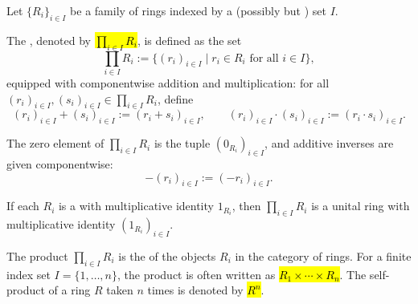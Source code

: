 \begin{definition} \label{definition:products_of_rings}
Let $\{R_i\}_{i \in I}$ be a family of rings indexed by a (possibly  but ) set $I$.

The , denoted by \hl{$\prod_{i \in I} R_i$}, is defined as the set
$$ \prod_{i \in I} R_i := \{ (r_i)_{i \in I} \mid r_i \in R_i \text{ for all } i \in I \}, $$
equipped with componentwise addition and multiplication: for all $(r_i)_{i \in I}, (s_i)_{i \in I} \in \prod_{i \in I} R_i$, define
$$ (r_i)_{i \in I} + (s_i)_{i \in I} := (r_i + s_i)_{i \in I}, \qquad (r_i)_{i \in I} \cdot (s_i)_{i \in I} := (r_i \cdot s_i)_{i \in I}. $$

The zero element of $\prod_{i \in I} R_i$ is the tuple $(0_{R_i})_{i \in I}$, and additive inverses are given componentwise:
$$ -(r_i)_{i \in I} := (-r_i)_{i \in I}. $$

If each $R_i$ is a  with multiplicative identity $1_{R_i}$, then $\prod_{i \in I} R_i$ is a unital ring with multiplicative identity $(1_{R_i})_{i \in I}$.

The product $\prod_{i \in I} R_i$ is the  of the objects $R_i$ in the category of rings. For a finite index set $I = \{1, \ldots, n\}$, the product is often written as \hl{$R_1 \times \cdots \times R_n$}. The self-product of a ring $R$ taken $n$ times is denoted by \hl{$R^n$}.
\end{definition}
